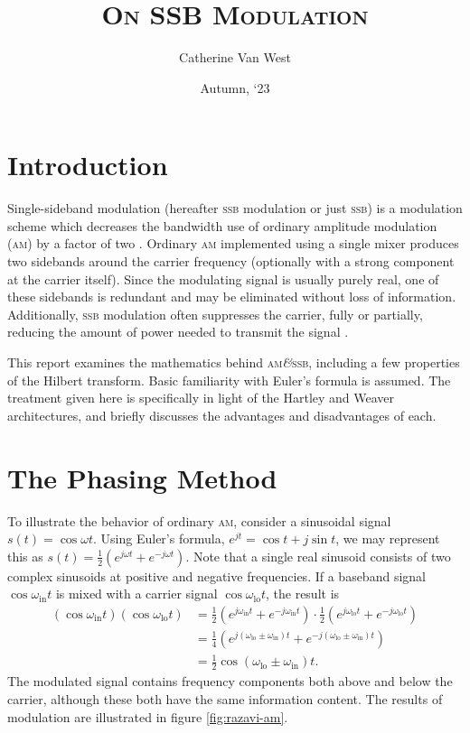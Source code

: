 \documentclass[12pt]{article}
\title{\textsc{On SSB Modulation}}
\author{Catherine Van West}
\date{Autumn, `23}
\newcommand{\amp}{\textit{\&}\xspace}
\newcommand{\am}{\textsc{am}\xspace}
\newcommand{\ssb}{\textsc{ssb}\xspace}
\begin{document}
\maketitle

\section*{Introduction}
Single-sideband modulation (hereafter \ssb modulation or just \ssb) is a
modulation scheme which decreases the bandwidth use of ordinary amplitude
modulation (\am) by a factor of two \autocite{ssb-thaddeus}. Ordinary \am
implemented using a single mixer produces two sidebands around the carrier
frequency (optionally with a strong component at the carrier itself). Since the
modulating signal is usually purely real, one of these sidebands is redundant
and may be eliminated without loss of information. Additionally, \ssb
modulation often suppresses the carrier, fully or partially, reducing the
amount of power needed to transmit the signal \autocite{weaver-rowell}.

This report examines the mathematics behind \am \amp \ssb, including a few
properties of the Hilbert transform. Basic familiarity with Euler's formula is
assumed. The treatment given here is specifically in light of the Hartley and
Weaver architectures, and briefly discusses the advantages and disadvantages of
each.

\section*{The Phasing Method}

\newcommand{\oin}{\omega_\text{in}}
\newcommand{\olo}{\omega_\text{lo}}

To illustrate the behavior of ordinary \am, consider a sinusoidal signal \(s(t)
= \cos \omega t\). Using Euler's formula, \(e^{jt} = \cos t + j \sin t\), we
may represent this as \(s(t) = \frac 1 2 (e^{j \omega t} + e^{- j \omega t})\).
Note that a single real sinusoid consists of two complex sinusoids at positive
and negative frequencies. If a baseband signal \(\cos \oin t\) is mixed with a
carrier signal \(\cos \olo t\), the result is
\begin{align*}
	\left(\cos \oin t\right) \left(\cos \olo t\right)
		&= \frac 1 2 \left(e^{j \oin t} + e^{-j \oin t}\right)
			\cdot \frac 1 2 \left(
				e^{j \olo t} + e^{-j \olo t}
			\right) \\
		&= \frac 1 4 \left(
			e^{j (\olo \pm \oin) t} + e^{-j (\olo \pm \oin) t}
		\right) \\
		&= \frac 1 2 \cos (\olo \pm \oin) t.
\end{align*}
The modulated signal contains frequency components both above and below the
carrier, although these both have the same information content. The results of
modulation are illustrated in figure \ref{fig:razavi-am}.
\end{document}
